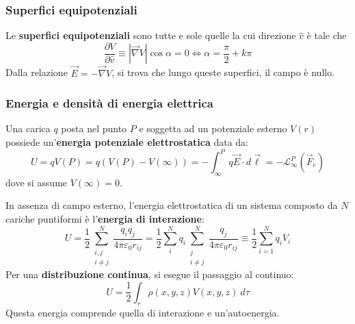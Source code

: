 \documentclass[10pt, a4paper]{scrartcl}
\numberwithin{equation}{subsection}
\theoremstyle{style1}
\begin{document}
\subsubsection{Superfici equipotenziali}


\noindent Le \textbf{superfici equipotenziali} sono tutte e sole quelle la cui direzione $\hat{v}$ \`e tale che 
\[
\frac{\partial V}{\partial \hat{v} }  \equiv \left\lvert \vec{\nabla }V  \right\rvert  \cos \alpha  = 0 \iff\alpha = \frac{\pi}{2} + k\pi
\] 
Dalla relazione $\vec{E} = -\vec{\nabla }V$, si trova che lungo queste superfici, il campo \`e nullo.
\subsubsection{Energia e densit\`a di energia elettrica}


Una carica $q$ posta nel punto $P$ e soggetta ad un potenziale esterno $V(r)$ possiede un'\textbf{energia potenziale elettrostatica} data da:
\begin{equation}
	U = qV(P) = q(V(P) - V(\infty)) =-\int_{\infty} ^P q\vec{E}\cdot d\vec{\ell } =- \mathcal{L}_\infty^P (\vec{F}_e)
\end{equation}
dove si assume $V(\infty) = 0$.

In assenza di campo esterno, l'energia elettrostatica di un sistema composto da $N$ cariche puntiformi \`e l'\textbf{energia di interazione}:
\begin{equation}
	U = \frac{1}{2} \sum_{\substack{i,j\\ i\neq j}}^{N} \frac{q_iq_j}{4\pi \varepsilon _0 r_{ij} } = \frac{1}{2}\sum_{i}^{N} q_i \sum_{\substack{j \\ i\neq j}}^{N} \frac{q_j}{4 \pi \varepsilon _0 r_{ij} } \equiv \frac{1}{2}\sum_{i=1}^{N} q_i V_i
\end{equation}
Per una \textbf{distribuzione continua}, si esegue il passaggio al continuo:
\begin{equation}
	U=\frac{1}{2}\int_{\tau } \rho (x,y,z) V(x,y,z) \ d\tau 
\end{equation}
Questa energia comprende quella di interazione e un'autoenergia.
\end{document}
